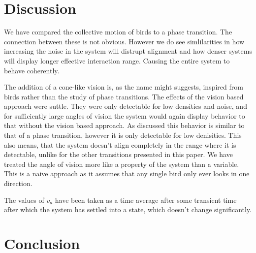 \documentclass[twoside,twocolumn]{article}
\begin{document}
\section{Discussion}

We have compared the collective motion of birds to a phase transition.
The connection between these is not obvious. However we do see simlilarities in how increasing the noise in the system
will distrupt alignment and how denser systems will display longer effective interaction range. Causing the entire
system to behave coherently.

The addition of a cone-like vision is, as the name might suggests, inspired from birds rather than the study of phase transitions.
The effects of the vision based approach were suttle. They were only detectable for low densities and noise, and for
sufficiently large angles of vision the system would again display behavior to that without the vision based approach.
As discussed this behavior is similar to that of a phase transition, however it is only detectable for low denisities.
This also means, that the system doesn't align completely in the range where it is detectable,
unlike for the other transitions presented in this paper. We have treated the angle of vision more like a property
of the system than a variable. This is a naive approach as it assumes that any single bird only ever looks in one direction.


The values of $v_a$ have been taken as a time average after some transient time after which the system has settled into a state, which doesn't change significantly.

\section{Conclusion}

\end{document}
